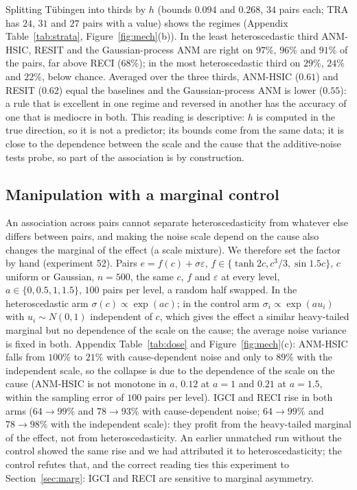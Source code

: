 Splitting T\"ubingen into thirds by $h$ (bounds $0.094$ and $0.268$, $34$ pairs each; TRA has $24$, $31$ and $27$ pairs with a value) shows the regimes (Appendix Table~\ref{tab:strata}, Figure~\ref{fig:mech}(b)). In the least heteroscedastic third ANM-HSIC, RESIT and the Gaussian-process ANM are right on $97\%$, $96\%$ and $91\%$ of the pairs, far above RECI ($68\%$); in the most heteroscedastic third on $29\%$, $24\%$ and $22\%$, below chance. Averaged over the three thirds, ANM-HSIC ($0.61$) and RESIT ($0.62$) equal the baselines and the Gaussian-process ANM is lower ($0.55$): a rule that is excellent in one regime and reversed in another has the accuracy of one that is mediocre in both. This reading is descriptive: $h$ is computed in the true direction, so it is not a predictor; its bounds come from the same data; it is close to the dependence between the scale and the cause that the additive-noise tests probe, so part of the association is by construction.





\subsection{Manipulation with a marginal control}\label{sec:dose}
An association across pairs cannot separate heteroscedasticity from whatever else differs between pairs, and making the noise scale depend on the cause also changes the marginal of the effect (a scale mixture). We therefore set the factor by hand (experiment 52). Pairs $e=f(c)+\sigma\varepsilon$, $f\in\{\tanh 2c,c^3/3,\sin 1.5c\}$, $c$ uniform or Gaussian, $n=500$, the same $c$, $f$ and $\varepsilon$ at every level, $a\in\{0,0.5,1,1.5\}$, $100$ pairs per level, a random half swapped. In the heteroscedastic arm $\sigma(c)\propto\exp(ac)$; in the control arm $\sigma_i\propto\exp(au_i)$ with $u_i\sim N(0,1)$ independent of $c$, which gives the effect a similar heavy-tailed marginal but no dependence of the scale on the cause; the average noise variance is fixed in both. Appendix Table~\ref{tab:dose} and Figure~\ref{fig:mech}(c): ANM-HSIC falls from $100\%$ to $21\%$ with cause-dependent noise and only to $89\%$ with the independent scale, so the collapse is due to the dependence of the scale on the cause (ANM-HSIC is not monotone in $a$, $0.12$ at $a=1$ and $0.21$ at $a=1.5$, within the sampling error of $100$ pairs per level). IGCI and RECI rise in both arms ($64\to99\%$ and $78\to93\%$ with cause-dependent noise; $64\to99\%$ and $78\to98\%$ with the independent scale): they profit from the heavy-tailed marginal of the effect, not from heteroscedasticity. An earlier unmatched run without the control showed the same rise and we had attributed it to heteroscedasticity; the control refutes that, and the correct reading ties this experiment to Section~\ref{sec:marg}: IGCI and RECI are sensitive to marginal asymmetry.





